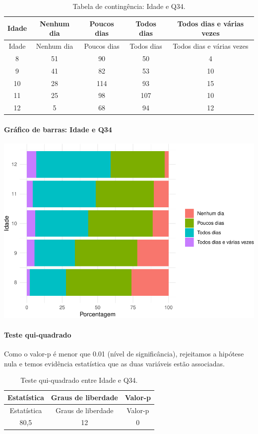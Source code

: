 \documentclass[]{article}
\let\oldparagraph\paragraph
\renewcommand{\paragraph}[1]{\oldparagraph{#1}\mbox{}}
\begin{document}
\begin{longtable}[]{@{}ccccc@{}}
\caption{\label{tab:unnamed-chunk-1213}Tabela de contingência: Idade e Q34.}\tabularnewline
\toprule
Idade & Nenhum dia & Poucos dias & Todos dias & Todos dias e várias vezes\tabularnewline
\midrule
\endfirsthead
\toprule
Idade & Nenhum dia & Poucos dias & Todos dias & Todos dias e várias vezes\tabularnewline
\midrule
\endhead
8 & 51 & 90 & 50 & 4\tabularnewline
9 & 41 & 82 & 53 & 10\tabularnewline
10 & 28 & 114 & 93 & 15\tabularnewline
11 & 25 & 98 & 107 & 10\tabularnewline
12 & 5 & 68 & 94 & 12\tabularnewline
\bottomrule
\end{longtable}

\hypertarget{gruxe1fico-de-barras-idade-e-q34}{%
\paragraph{Gráfico de barras: Idade e Q34}\label{gruxe1fico-de-barras-idade-e-q34}}

\begin{center}\includegraphics[width=0.75\linewidth]{relatorio_covid19_files/figure-latex/unnamed-chunk-1214-1} \end{center}

\hypertarget{teste-qui-quadrado-104}{%
\paragraph{Teste qui-quadrado}\label{teste-qui-quadrado-104}}

Como o valor-p é menor que 0.01 (nível de significância), rejeitamos a hipótese nula e temos evidência estatística que as duas variáveis estão associadas.

\begin{longtable}[]{@{}ccc@{}}
\caption{\label{tab:unnamed-chunk-1216}Teste qui-quadrado entre Idade e Q34.}\tabularnewline
\toprule
Estatística & Graus de liberdade & Valor-p\tabularnewline
\midrule
\endfirsthead
\toprule
Estatística & Graus de liberdade & Valor-p\tabularnewline
\midrule
\endhead
80,5 & 12 & 0\tabularnewline
\bottomrule
\end{longtable}
\end{document}
